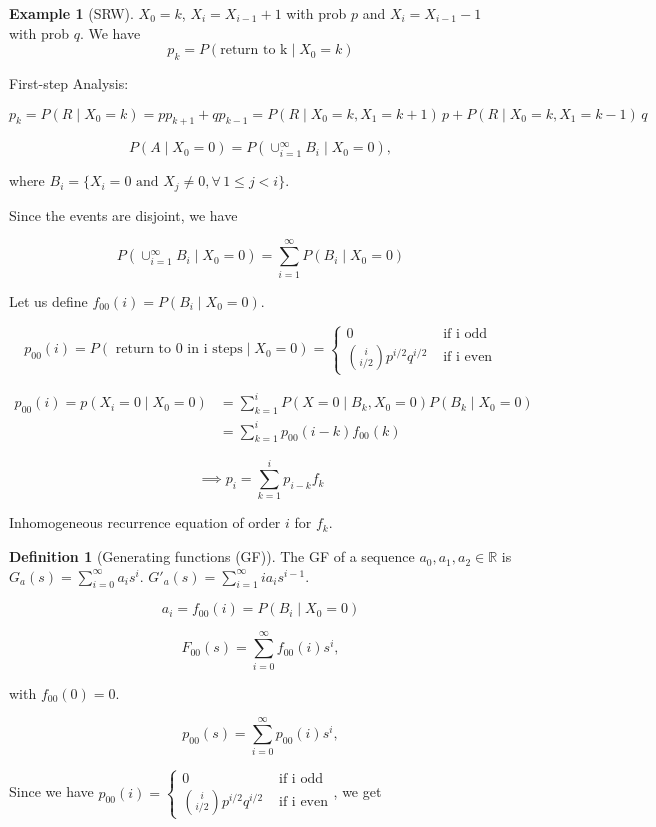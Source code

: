 \documentclass{article}
\theoremstyle{definition}
\newtheorem{exmp}{Example}[section]
\newtheorem{defn}{Definition}[section]
\begin{document}
\begin{exmp}[SRW]
$X_0 = k$, $X_i = X_{i-1} + 1$ with prob $p$ and $X_{i} = X_{i-1} -1$ with prob $q$.
We have
$$
p_k = P(\text{return to k} \mid X_0 = k)
$$

First-step Analysis:

$$
p_k = P(R \mid X_0 = k) = p p_{k+1} + q p_{k-1} = P(R \mid X_0 = k, X_1 = k+1) \, p + P(R \mid X_0 = k, X_1 = k-1) \, q
$$

$$
P(A \mid X_0 = 0) = P \left( \cup_{i=1}^\infty B_i \mid X_0 = 0 \right),
$$

where $B_i = \{ X_i = 0 \text{ and } X_j \ne 0, \forall \, 1 \le j < i\}$.

Since the events are disjoint, we have

$$
P \left( \cup_{i=1}^\infty B_i \mid X_0 = 0 \right) = \sum_{i=1}^\infty P(B_i \mid X_0 = 0)
$$

Let us define $f_{00}(i) =  P(B_i \mid X_0 = 0)$.

$$
p_{00}(i) = P(\text{ return to 0 in i steps} \mid X_0 = 0) = \begin{cases}
0 & \text{ if i odd} \\
{ i \choose i/2} p^{i/2} q^{i/2} & \text{ if i even} 
\end{cases}
$$

\begin{align*}
p_{00}(i) = p(X_i = 0 \mid X_0 = 0) 
&= \sum_{k=1}^i P(X=0 \mid B_k, X_0 = 0) P(B_k \mid X_0 = 0) \\
&=  \sum_{k=1}^i p_{00}(i-k) f_{00}(k)
\end{align*}

$$
\implies p_i = \sum_{k=1}^i p_{i-k} f_k
$$

Inhomogeneous recurrence equation of order $i$ for $f_k$.


\begin{defn}[Generating functions (GF)]
The GF of a sequence $a_0, a_1, a_2 \in \mathbb{R}$ is $G_a(s) = \sum_{i=0}^\infty a_i s^i$. $G'_a(s) = \sum_{i=1}^\infty i a_i s^{i-1}$.
\end{defn}

$$
a_i = f_{00}(i) = P(B_i \mid X_0 = 0)
$$

$$ 
F_{00}(s) = \sum_{i=0}^\infty f_{00}(i) s^i,
$$

with $f_{00}(0) = 0$. 

$$
p_{00}(s) = \sum_{i=0}^\infty p_{00}(i) s^i,
$$

Since we have
$p_{00}(i)  = \begin{cases}
0 & \text{ if i odd} \\
{ i \choose i/2} p^{i/2} q^{i/2} & \text{ if i even} 
\end{cases}$, we get


\end{exmp}
\end{document}
